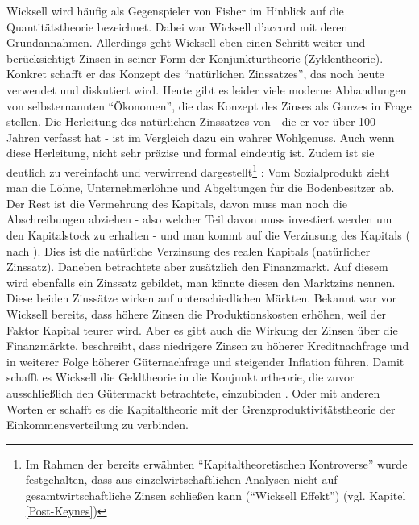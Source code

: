 Wicksell wird häufig als Gegenspieler von Fisher im Hinblick auf die Quantitätstheorie bezeichnet. Dabei war Wicksell d'accord mit deren Grundannahmen. Allerdings geht Wicksell eben einen Schritt weiter und berücksichtigt Zinsen in seiner Form der Konjunkturtheorie (Zyklentheorie). Konkret schafft er das Konzept des "`natürlichen Zinssatzes"', das noch heute verwendet und diskutiert wird. Heute gibt es leider viele moderne Abhandlungen von selbsternannten "`Ökonomen"', die das Konzept des Zinses als Ganzes in Frage stellen. Die Herleitung des natürlichen Zinssatzes von \textcite{Wicksel1898} - die er vor über 100 Jahren verfasst hat - ist im Vergleich dazu ein wahrer Wohlgenuss. Auch wenn diese Herleitung, nicht sehr präzise und formal eindeutig ist. Zudem ist sie deutlich zu vereinfacht und verwirrend dargestellt\footnote{Im Rahmen der bereits erwähnten "`Kapitaltheoretischen Kontroverse"' wurde festgehalten, dass aus einzelwirtschaftlichen Analysen nicht auf gesamtwirtschaftliche Zinsen schließen kann ("`Wicksell Effekt"')  (vgl. Kapitel \ref{Post-Keynes})} \parencite[S. 639]{Blaug1962}: Vom Sozialprodukt zieht man die Löhne, Unternehmerlöhne und Abgeltungen für die Bodenbesitzer ab. Der Rest ist die Vermehrung des Kapitals, davon muss man noch die Abschreibungen abziehen - also welcher Teil davon muss investiert werden um den Kapitalstock zu erhalten - und man kommt auf die Verzinsung des Kapitals (\textcite[S. 113ff]{Wicksel1898} nach \textcite[S. 407]{Rosner2012}). Dies ist die natürliche Verzinsung des realen Kapitals (natürlicher Zinssatz). Daneben betrachtete \textcite{Wicksel1898} aber zusätzlich den Finanzmarkt. Auf diesem wird ebenfalls ein Zinssatz gebildet, man könnte diesen den Marktzins nennen.
Diese beiden Zinssätze wirken auf unterschiedlichen Märkten. Bekannt war vor Wicksell bereits, dass höhere Zinsen die Produktionskosten erhöhen, weil der Faktor Kapital teurer wird. Aber es gibt auch die Wirkung der Zinsen über die Finanzmärkte. \textcite[S. 73f]{Wicksel1898} beschreibt, dass niedrigere Zinsen zu höherer Kreditnachfrage und in weiterer Folge höherer Güternachfrage und steigender Inflation führen. Damit schafft es Wicksell die Geldtheorie in die Konjunkturtheorie, die zuvor ausschließlich den Gütermarkt betrachtete, einzubinden \parencite[S. 5]{Blanchard2000}. Oder mit anderen Worten er schafft es die Kapitaltheorie mit der Grenzproduktivitätstheorie der Einkommensverteilung zu verbinden. 

